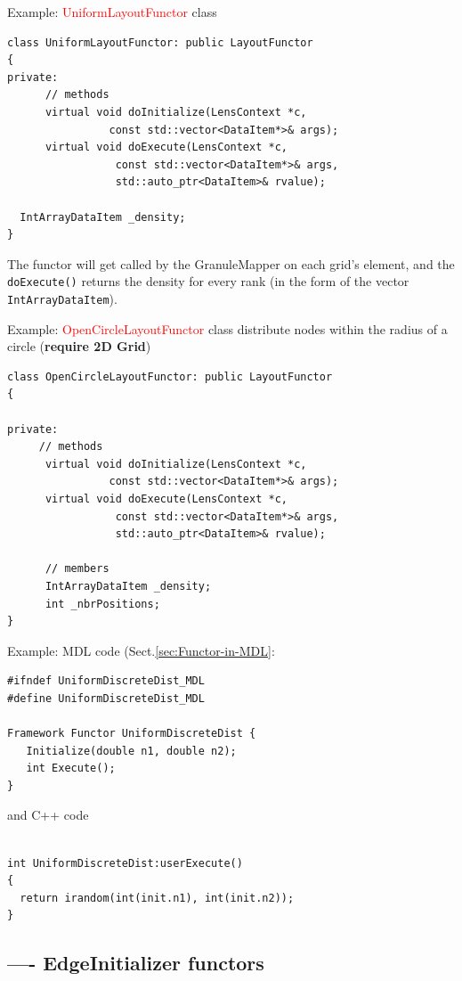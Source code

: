 \label{sec:UniformLayoutFunctor}
Example: \textcolor{red}{UniformLayoutFunctor} class
\begin{verbatim}
class UniformLayoutFunctor: public LayoutFunctor
{
private:
      // methods
      virtual void doInitialize(LensContext *c, 
				const std::vector<DataItem*>& args);
      virtual void doExecute(LensContext *c, 
			     const std::vector<DataItem*>& args, 
			     std::auto_ptr<DataItem>& rvalue);

  IntArrayDataItem _density;
}
\end{verbatim}
The functor will get called by the GranuleMapper on each grid's element, and the
\verb!doExecute()! returns the density for every rank (in the form of the
vector \verb!IntArrayDataItem!). 


\label{sec:OpenCircleLayoutFunctor}
Example: \textcolor{red}{OpenCircleLayoutFunctor} class distribute nodes within
the radius of a circle ({\bf require 2D Grid})
\begin{verbatim}
class OpenCircleLayoutFunctor: public LayoutFunctor
{

private:
     // methods
      virtual void doInitialize(LensContext *c, 
				const std::vector<DataItem*>& args);
      virtual void doExecute(LensContext *c, 
			     const std::vector<DataItem*>& args,
			     std::auto_ptr<DataItem>& rvalue);

      // members
      IntArrayDataItem _density;
      int _nbrPositions;
}
\end{verbatim}

Example:  
\label{UniformDiscreteDist} MDL code (Sect.\ref{sec:Functor-in-MDL}:
\begin{verbatim}
#ifndef UniformDiscreteDist_MDL
#define UniformDiscreteDist_MDL

Framework Functor UniformDiscreteDist {
   Initialize(double n1, double n2);
   int Execute();
}
\end{verbatim}
and C++ code
\begin{verbatim}

int UniformDiscreteDist:userExecute()
{
  return irandom(int(init.n1), int(init.n2));
}
\end{verbatim}


\subsection{---- EdgeInitializer functors}
\label{sec:EdgeInitializer-functors}
\label{sec:functor-EdgeInitializer}




